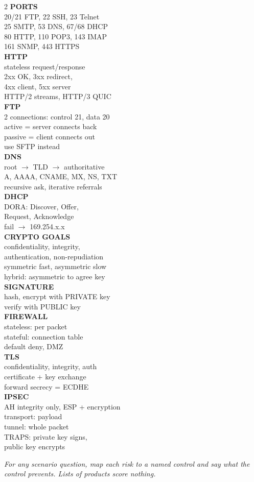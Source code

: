 \documentclass[11pt,a4paper]{article}
\begin{document}
\begin{multicols}{2}
\textbf{PORTS}\\
20/21 FTP, 22 SSH, 23 Telnet\\
25 SMTP, 53 DNS, 67/68 DHCP\\
80 HTTP, 110 POP3, 143 IMAP\\
161 SNMP, 443 HTTPS\\[5pt]
\textbf{HTTP}\\
stateless request/response\\
2xx OK, 3xx redirect,\\
4xx client, 5xx server\\
HTTP/2 streams, HTTP/3 QUIC\\[5pt]
\textbf{FTP}\\
2 connections: control 21, data 20\\
active = server connects back\\
passive = client connects out\\
use SFTP instead\\[5pt]
\textbf{DNS}\\
root $\to$ TLD $\to$ authoritative\\
A, AAAA, CNAME, MX, NS, TXT\\
recursive ask, iterative referrals\\[5pt]
\textbf{DHCP}\\
DORA: Discover, Offer,\\
Request, Acknowledge\\
fail $\to$ 169.254.x.x\\[5pt]
\textbf{CRYPTO GOALS}\\
confidentiality, integrity,\\
authentication, non-repudiation\\
symmetric fast, asymmetric slow\\
hybrid: asymmetric to agree key\\[5pt]
\textbf{SIGNATURE}\\
hash, encrypt with PRIVATE key\\
verify with PUBLIC key\\[5pt]
\textbf{FIREWALL}\\
stateless: per packet\\
stateful: connection table\\
default deny, DMZ\\[5pt]
\textbf{TLS}\\
confidentiality, integrity, auth\\
certificate + key exchange\\
forward secrecy = ECDHE\\[5pt]
\textbf{IPSEC}\\
AH integrity only, ESP + encryption\\
transport: payload\\
tunnel: whole packet\\
TRAPS: private key signs,\\
public key encrypts
\end{multicols}

\vfill
\begin{center}\textit{For any scenario question, map each risk to a named control and say what the control prevents. Lists of products score nothing.}\end{center}
\end{document}
